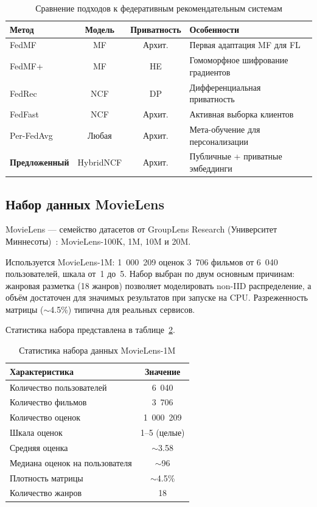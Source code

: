 \documentclass[14pt,a4paper]{extarticle}
\begin{document}
\begin{table}[H]
\caption{Сравнение подходов к федеративным рекомендательным системам}
\label{tab:related_work}
\centering
\small
\begin{tabularx}{\textwidth}{lccX}
\toprule
\textbf{Метод} & \textbf{Модель} & \textbf{Приватность} & \textbf{Особенности} \\
\midrule
FedMF~\cite{ammad2019federated}   & MF      & Архит.       & Первая адаптация MF для FL \\
FedMF+~\cite{chai2020secure}      & MF      & HE           & Гомоморфное шифрование градиентов \\
FedRec~\cite{lin2020fedrec}       & NCF     & DP           & Дифференциальная приватность \\
FedFast~\cite{muhammad2020fedfast}& NCF     & Архит.       & Активная выборка клиентов \\
Per-FedAvg~\cite{fallah2020personalized} & Любая & Архит.  & Мета-обучение для персонализации \\
\textbf{Предложенный}             & HybridNCF & Архит.     & Публичные + приватные эмбеддинги \\
\bottomrule
\end{tabularx}
\end{table}


\subsection{Набор данных MovieLens}

MovieLens --- семейство датасетов от GroupLens Research (Университет Миннесоты)~\cite{harper2015movielens}: MovieLens-100K, 1M, 10M и 20M.

Используется MovieLens-1M: 1~000~209 оценок 3~706 фильмов от 6~040 пользователей, шкала от~1 до~5. Набор выбран по двум основным причинам: жанровая разметка (18 жанров) позволяет моделировать non-IID распределение, а объём достаточен для значимых результатов при запуске на CPU. Разреженность матрицы ($\sim$4.5\%) типична для реальных сервисов.

Статистика набора представлена в таблице~\ref{tab:movielens_stats}.

\begin{table}[H]
\caption{Статистика набора данных MovieLens-1M}
\label{tab:movielens_stats}
\centering
\begin{tabular}{lc}
\toprule
\textbf{Характеристика} & \textbf{Значение} \\
\midrule
Количество пользователей & 6~040 \\
Количество фильмов       & 3~706 \\
Количество оценок         & 1~000~209 \\
Шкала оценок              & 1--5 (целые) \\
Средняя оценка            & $\sim$3.58 \\
Медиана оценок на пользователя & $\sim$96 \\
Плотность матрицы         & $\sim$4.5\% \\
Количество жанров         & 18 \\
\bottomrule
\end{tabular}
\end{table}
\end{document}

